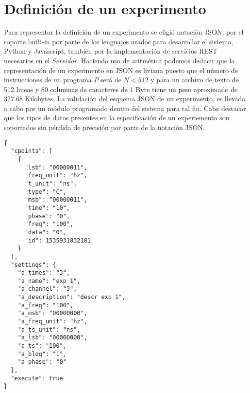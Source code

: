 \section{Definici\'on de un experimento}

Para representar la definici\'on de un experimento se eligi\'o notaci\'on JSON, 
por el soporte built-in por parte de los lenguajes usados para desarrollar el sistema, 
Python y Javascript, tambi\'en por la implementaci\'on de servicios REST necesarios en el \textit{Servidor}.
Haciendo uso de aritm\'etica podemos deducir que la representaci\'on de un experimento en JSON
es liviana puesto que el n\'umero de instrucciones de un programa \(P\) ser\'a de \(N < 512 \) 
y para un archivo de texto de 512 lineas y 80 columnas de caracteres de 1 Byte 
tiene un peso aproximado de 327.68 Kilobytes.
La validaci\'on del esquema JSON de un experimento, es llevada a cabo por un m\'odulo programado
dentro del sistema para tal fin.
Cabe destacar que los tipos de datos presentes en la especificaci\'on de un experiemento son
soportados sin p\'erdida de precisi\'on por parte de la notaci\'on JSON.


\begin{lstlisting}
{
  "cpoints": [
    {
      "lsb": "00000011",
      "freq_unit": "hz",
      "t_unit": "ns",
      "type": "C",
      "msb": "00000011",
      "time": "10",
      "phase": "0",
      "freq": "100",
      "data": "0",
      "id": 1535931832181
    }
  ],
  "settings": {
    "a_times": "3",
    "a_name": "exp 1",
    "a_channel": "3",
    "a_description": "descr exp 1",
    "a_freq": "100",
    "a_msb": "00000000",
    "a_freq_unit": "hz",
    "a_ts_unit": "ns",
    "a_lsb": "00000000",
    "a_ts": "100",
    "a_bloq": "1",
    "a_phase": "0"
  },
  "execute": true
}
\end{lstlisting}

\newpage

